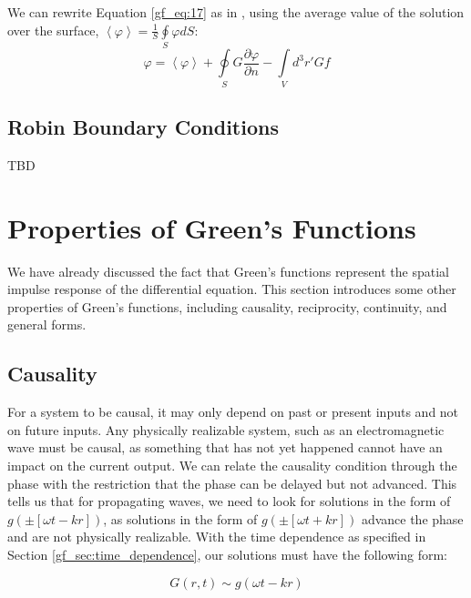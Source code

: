 We can rewrite Equation \ref{gf_eq:17} as in \cite{jackson_classical_em}, using the average value of the solution over the surface, $\left< \varphi\right> = \frac{1}{S}\oint\limits_{S}\varphi dS$:
\begin{equation}
\boxed{\varphi = \left<\varphi \right> + \oint\limits_{S}G\frac{\partial \varphi}{\partial n}  -\int\limits_{V}d^3r' Gf}
\label{gf_eq:18}
\end{equation}
\renewcommand{\baselinestretch}{2} \small\normalsize

\subsection{Robin Boundary Conditions}
TBD

\section{Properties of Green's Functions} \label{gf_sec:properties}
We have already discussed the fact that Green's functions represent the spatial impulse response of the differential equation. This section introduces some other properties of Green's functions, including causality, reciprocity, continuity, and general forms.

\subsection{Causality} \label{gf_sec:causality}
For a system to be causal, it may only depend on past or present inputs and not on future inputs. Any physically realizable system, such as an electromagnetic wave must be causal, as something that has not yet happened cannot have an impact on the current output. We can relate the causality condition through the phase with the restriction that the phase can be delayed but not advanced. This tells us that for propagating waves, we need to look for solutions in the form of $g\left(\pm\left[\omega t - kr\right]\right)$, as solutions in the form of $g\left(\pm\left[\omega t + kr\right]\right)$ advance the phase and are not physically realizable. With the time dependence as specified in Section \ref{gf_sec:time_dependence}, our solutions must have the following form:

\begin{equation}
G\left(r,t\right) \sim g\left(\omega t - kr\right)
\label{gf_eq:18a}
\end{equation}
\renewcommand{\baselinestretch}{2} \small\normalsize

